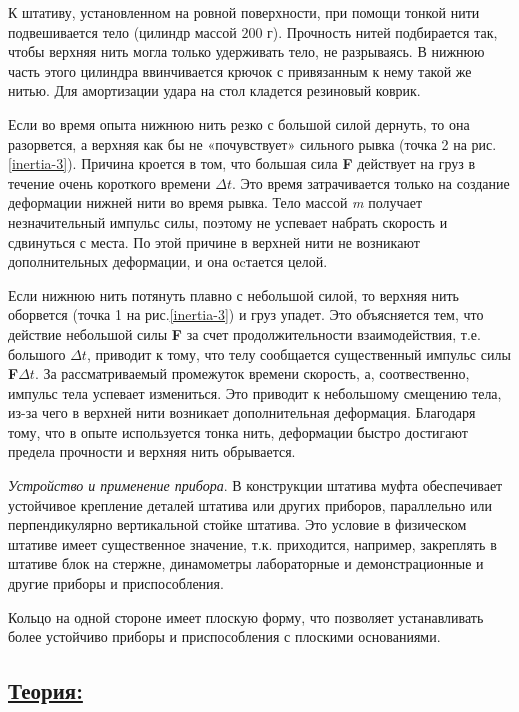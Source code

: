 \documentclass[14pt,a4paper,oneside]{extarticle}	%
\begin{document}
К штативу, установленном на ровной поверхности, при помощи тонкой нити подвешивается тело (цилиндр массой $ 200 $ г).
Прочность нитей подбирается так, чтобы верхняя нить могла только удерживать тело, не разрываясь.
В нижнюю часть этого цилиндра ввинчивается крючок с привязанным к нему такой же нитью.
Для амортизации удара на стол кладется резиновый коврик.

Если во время опыта нижнюю нить резко с большой силой дернуть, то она разорвется, а верхняя как бы не «почувствует» сильного рывка (точка 2 на рис.\ref{inertia-3}). 
Причина кроется в том, что большая сила \textbf{F} действует на груз в течение очень короткого времени $ \Delta t $. 
Это время затрачивается только на создание деформации нижней нити во время рывка. 
Тело массой \textit{m} получает незначительный импульс силы, поэтому не успевает набрать скорость и сдвинуться с места.
По этой причине в верхней нити не возникают дополнительных деформации, и она оcтается целой. 

Если нижнюю нить потянуть плавно с небольшой силой, то верхняя нить оборвется (точка 1 на рис.\ref{inertia-3}) и груз упадет.
Это объясняется тем, что действие небольшой силы \textbf{F} за счет продолжительности взаимодействия, т.е. большого $ \Delta t $, приводит к тому, что телу сообщается существенный импульс силы \textbf{F}$ \Delta t $.
За рассматриваемый промежуток времени скорость, а, соотвественно, импульс тела успевает измениться. 
Это приводит к небольшому смещению тела, из-за чего в верхней нити возникает дополнительная деформация.
Благодаря тому, что в опыте используется тонка нить, деформации быстро достигают предела прочности и верхняя нить обрывается. 

\textit{Устройство и применение прибора}. В конструкции штатива муфта обеспечивает устойчивое крепление деталей штатива или других приборов, параллельно или перпендикулярно вертикальной стойке штатива.
Это условие в физическом штативе имеет существенное значение, т.к. приходится, например, закреплять в штативе блок на стержне, динамометры лабораторные и демонстрационные и другие приборы и приспособления.

Кольцо на одной стороне имеет плоскую форму, что позволяет устанавливать более устойчиво приборы и приспособления с плоскими основаниями.

\newpage
\subsection*{\underline{Теория:}}
\end{document}
